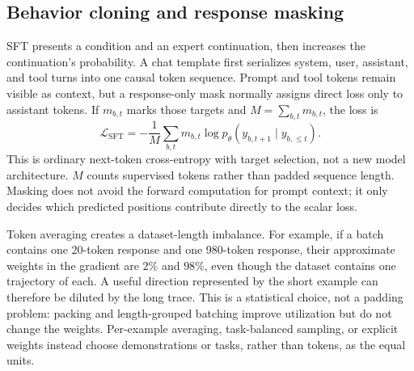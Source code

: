 \subsection{Behavior cloning and response masking}

SFT presents a condition and an expert continuation, then increases the continuation's
probability. A chat template first serializes system, user, assistant, and tool turns into
one causal token sequence. Prompt and tool tokens remain visible as context, but a
response-only mask normally assigns direct loss only to assistant tokens. If $m_{b,t}$
marks those targets and $M=\sum_{b,t}m_{b,t}$, the loss is
\begin{equation}
  \mathcal{L}_{\mathrm{SFT}}
  =-\frac{1}{M}\sum_{b,t}m_{b,t}
    \log p_\theta(y_{b,t+1}\mid y_{b,\leq t}).
  \label{eq:sft-loss}
\end{equation}
This is ordinary next-token cross-entropy with target selection, not a new model
architecture. $M$ counts supervised tokens rather than padded sequence length. Masking
does not avoid the forward computation for prompt context; it only decides which predicted
positions contribute directly to the scalar loss.

Token averaging creates a dataset-length imbalance. For example, if a batch contains one
20-token response and one 980-token response, their approximate weights in the gradient
are $2\%$ and $98\%$, even though the dataset contains one trajectory of each. A useful
direction represented by the short example can therefore be diluted by the long trace.
This is a statistical choice, not a padding problem: packing and length-grouped batching
improve utilization but do not change the weights. Per-example averaging, task-balanced
sampling, or explicit weights instead choose demonstrations or tasks, rather than tokens,
as the equal units.

